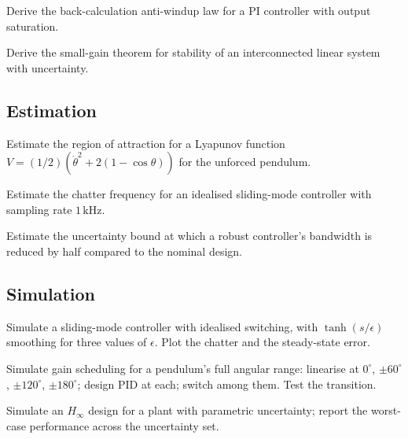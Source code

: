 \begin{exercise}
Derive the back-calculation anti-windup law for a PI controller with output saturation.
\end{exercise}

\begin{exercise}
Derive the small-gain theorem for stability of an interconnected linear system with uncertainty.
\end{exercise}

\subsection*{Estimation}

\begin{exercise}
Estimate the region of attraction for a Lyapunov function $V = (1/2)(\dot{\theta}^2 + 2(1 - \cos\theta))$ for the unforced pendulum.
\end{exercise}

\begin{exercise}
Estimate the chatter frequency for an idealised sliding-mode controller with sampling rate $1\,\text{kHz}$.
\end{exercise}

\begin{exercise}
Estimate the uncertainty bound at which a robust controller's bandwidth is reduced by half compared to the nominal design.
\end{exercise}

\subsection*{Simulation}

\begin{exercise}
Simulate a sliding-mode controller with idealised switching, with $\tanh(s/\epsilon)$ smoothing for three values of $\epsilon$. Plot the chatter and the steady-state error.
\end{exercise}

\begin{exercise}
Simulate gain scheduling for a pendulum's full angular range: linearise at $0^\circ$, $\pm 60^\circ$, $\pm 120^\circ$, $\pm 180^\circ$; design PID at each; switch among them. Test the transition.
\end{exercise}

\begin{exercise}
Simulate an $H_\infty$ design for a plant with parametric uncertainty; report the worst-case performance across the uncertainty set.
\end{exercise}

